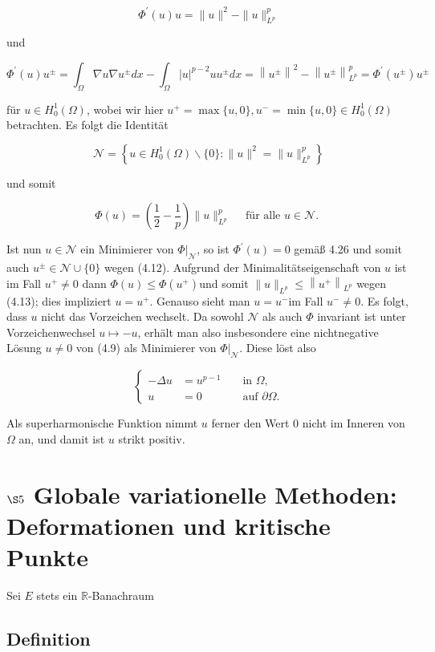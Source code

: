 \documentclass[10pt, letterpaper]{article}
\begin{document}
$$
\Phi^{\prime}(u) u=\|u\|^{2}-\|u\|_{L^{p}}^{p}
$$

und

$$
\Phi^{\prime}(u) u^{ \pm}=\int_{\Omega} \nabla u \nabla u^{ \pm} d x-\int_{\Omega}|u|^{p-2} u u^{ \pm} d x=\left\|u^{ \pm}\right\|^{2}-\left\|u^{ \pm}\right\|_{L^{p}}^{p}=\Phi^{\prime}\left(u^{ \pm}\right) u^{ \pm}
$$

für $u \in H_{0}^{1}(\Omega)$, wobei wir hier $u^{+}=\max \{u, 0\}, u^{-}=\min \{u, 0\} \in H_{0}^{1}(\Omega)$ betrachten. Es folgt die Identität

$$
\mathcal{N}=\left\{u \in H_{0}^{1}(\Omega) \backslash\{0\}:\|u\|^{2}=\|u\|_{L^{p}}^{p}\right\}
$$

und somit

$$
\Phi(u)=\left(\frac{1}{2}-\frac{1}{p}\right)\|u\|_{L^{p}}^{p} \quad \text { für alle } u \in \mathcal{N} \text {. }
$$

Ist nun $u \in \mathcal{N}$ ein Minimierer von $\left.\Phi\right|_{\mathcal{N}}$, so ist $\Phi^{\prime}(u)=0$ gemäß 4.26 und somit auch $u^{ \pm} \in \mathcal{N} \cup\{0\}$ wegen (4.12). Aufgrund der Minimalitätseigenschaft von $u$ ist im Fall $u^{+} \neq 0$ dann $\Phi(u) \leq \Phi\left(u^{+}\right)$und somit $\|u\|_{L^{p}} \leq\left\|u^{+}\right\|_{L^{p}}$ wegen (4.13); dies impliziert $u=u^{+}$. Genauso sieht man $u=u^{-}$im Fall $u^{-} \neq 0$. Es folgt, dass $u$ nicht das Vorzeichen wechselt. Da sowohl $\mathcal{N}$ als auch $\Phi$ invariant ist unter Vorzeichenwechsel $u \mapsto-u$, erhält man also insbesondere eine nichtnegative Lösung $u \neq 0$ von (4.9) als Minimierer von $\left.\Phi\right|_{\mathcal{N}}$. Diese löst also

$$
\left\{\begin{aligned}
-\Delta u & =u^{p-1} & & \text { in } \Omega, \\
u & =0 & & \text { auf } \partial \Omega .
\end{aligned}\right.
$$

Als superharmonische Funktion nimmt $u$ ferner den Wert 0 nicht im Inneren von $\Omega$ an, und damit ist $u$ strikt positiv.

\section*{$\S 5$ Globale variationelle Methoden: Deformationen und kritische Punkte}

Sei $E$ stets ein $\mathbb{R}$-Banachraum

\subsection*{Definition}
\end{document}
